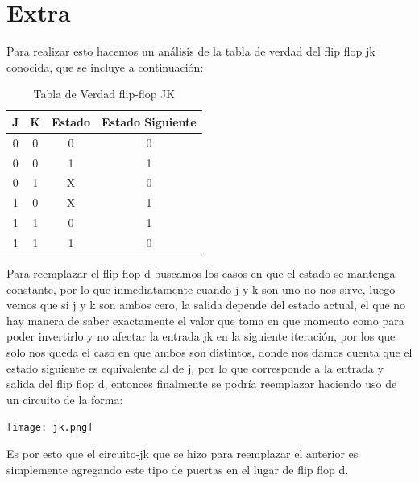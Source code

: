 \documentclass[11pt,letterpaper]{article}
\begin{document}
\section{Extra}
Para realizar esto hacemos un análisis de la tabla de verdad del flip flop jk conocida, que se incluye a continuación:
\begin{table}[h]
\centering
\caption{Tabla de Verdad flip-flop JK}
\vspace{0.2cm}
\label{tab-jk}
\begin{tabular}{|c|c|c|c|}
\hline
J & K & Estado & Estado Siguiente \\ \hline
0 & 0 & 0      & 0                \\ \hline
0 & 0 & 1      & 1                \\ \hline
0 & 1 & X      & 0                \\ \hline
1 & 0 & X      & 1                \\ \hline
1 & 1 & 0      & 1                \\ \hline
1 & 1 & 1      & 0                \\ \hline
\end{tabular}
\end{table}
\vspace{0.2cm}
Para reemplazar el flip-flop d buscamos los casos en que el estado se mantenga constante, por lo que inmediatamente cuando j y k son uno no nos sirve, luego vemos que si j y k son ambos cero, la salida depende del estado actual, el que no hay manera de saber exactamente el valor que toma en que momento como para poder invertirlo y no afectar la entrada jk en la siguiente iteración, por los que solo nos queda el caso en que ambos son distintos, donde nos damos cuenta que el estado siguiente es equivalente al de j, por lo que corresponde a la entrada y salida del flip flop d, entonces finalmente se podría reemplazar haciendo uso de un circuito de la forma:
\begin{center}
\texttt{[image: jk.png]}
\end{center}

Es por esto que el circuito-jk que se hizo para reemplazar el anterior es simplemente agregando este tipo de puertas en el lugar de flip flop d.
\end{document}
